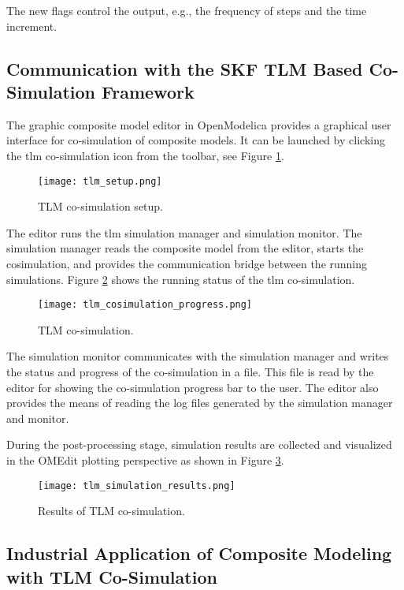 The new flags control the output, e.g., the frequency of
steps and the time increment. 

\subsection{Communication with the SKF TLM Based Co-Simulation Framework}
\label{sec:tlmskf}

The graphic composite model editor in OpenModelica
provides a graphical user interface for co-simulation of
composite models. It can be launched by clicking the
\acrshort{tlm} co-simulation icon from the toolbar, see
Figure \ref{fig:tlmsetup}.

\begin{figure}
	\texttt{[image: tlm\_setup.png]}
	\caption{TLM co-simulation setup.}
	\label{fig:tlmsetup}
\end{figure}

The editor runs the \acrshort{tlm} simulation manager and simulation monitor. The simulation manager reads the
composite model from the editor, starts the cosimulation, and provides the communication bridge
between the running simulations. Figure \ref{fig:tlmcosimulationprogress} shows the running status of the \acrshort{tlm} co-simulation.

\begin{figure}
	\texttt{[image: tlm\_cosimulation\_progress.png]}
	\caption{TLM co-simulation.}
	\label{fig:tlmcosimulationprogress}
\end{figure}

The simulation monitor communicates with the simulation manager and writes the status and progress of the co-simulation in a file. This file is read by the editor for showing the co-simulation progress bar to the user. The editor also provides the means of reading the log files generated by the simulation manager and monitor.

During the post-processing stage, simulation results are collected and visualized in the OMEdit 
plotting perspective as shown in Figure \ref{fig:tlmsimulationresults}.
 
\begin{figure}
	\texttt{[image: tlm\_simulation\_results.png]}
	\caption{Results of TLM co-simulation.}
	\label{fig:tlmsimulationresults}
\end{figure}


\subsection{Industrial Application of Composite Modeling with TLM Co-Simulation}
\label{sec:tlmapplication}

